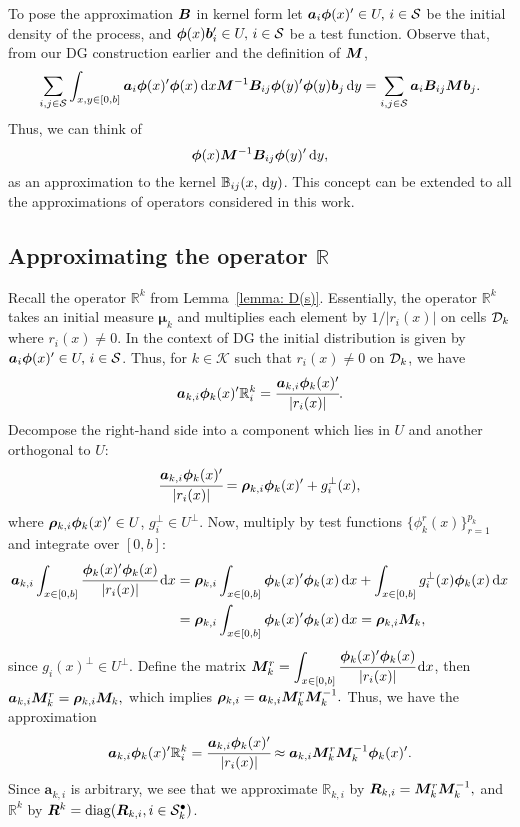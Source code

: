 To pose the approximation \(\boldsymbol B\) in kernel form let \(\boldsymbol a_i \boldsymbol \phi(x)'{}\in U,\,i\in\mathcal{S}\) be the initial density of the process, and \(\boldsymbol \phi(x)\boldsymbol b_i'{}\in U,\,i\in\mathcal{S}\) be a test function. Observe that, from our DG construction earlier and the definition of \({\boldsymbol M}\), 
\[\sum_{i,j\in\mathcal{S}}\int_{x,y\in[0,b]} \boldsymbol a_i \boldsymbol \phi(x)'{} \boldsymbol \phi (x) \, \mathrm{d} x {\boldsymbol M}^{-1}{  \boldsymbol B}_{ij} \boldsymbol \phi(y)'{} \boldsymbol \phi(y)\boldsymbol b_j \, \mathrm{d} y= \sum_{i,j\in\mathcal{S}} \boldsymbol a_i {  \boldsymbol B}_{ij} {\boldsymbol M} \boldsymbol b_j .\]
Thus, we can think of 
\[\boldsymbol \phi (x) {\boldsymbol M}^{-1}{  \boldsymbol B}_{ij} \boldsymbol \phi(y)'{}\, \mathrm{d} y,\]
as an approximation to the kernel \(\mathbb B_{ij}(x,\, \mathrm{d} y)\). This concept can be extended to all the approximations of operators considered in this work. 

\subsection{Approximating the operator \(\mathbb R\)}\label{sec: approx r}
Recall the operator \(\mathbb R^k\) from Lemma~\ref{lemma: D(s)}. Essentially, the operator \(\mathbb R^k\) takes an initial measure \(\boldsymbol \mu_k\) and multiplies each element by \(1/|r_i(x)|\) on cells \(\mathcal{D}_k\) where \(r_i(x)\neq 0\). In the context of DG the initial distribution is given by \(\boldsymbol a_i \boldsymbol \phi(x)'{}\in U,\,i\in\mathcal{S}\). Thus, for \(k\in\mathcal K\) such that \(r_i(x)\neq0\) on \(\mathcal{D}_k\), we have 
\[\boldsymbol a_{k,i} \boldsymbol \phi_k(x)'{}\mathbb R^k_i = \cfrac{\boldsymbol a_{k,i} \boldsymbol \phi_k(x)'{}}{|r_i(x)|}.\]
Decompose the right-hand side into a component which lies in \(U\) and another orthogonal to \(U\): 
\[\cfrac{\boldsymbol a_{k,i} \boldsymbol \phi_k(x)'{}}{|r_i(x)|} = \boldsymbol \rho_{k,i} \boldsymbol \phi_k(x)'{} + g_i^\perp(x),\] where \(\boldsymbol \rho_{k,i} \boldsymbol\phi_k(x)'{}\in U\), \(g_i^\perp \in U^\perp\). Now, multiply by test functions \(\{\phi^r_k(x)\}_{r=1}^{p_k}\) and integrate over \([0,b]\):
\begin{align*}
	\boldsymbol a_{k,i}\int_{x\in[0,b]} \cfrac{ \boldsymbol \phi_k(x)'{}\boldsymbol \phi_k(x)}{|r_i(x)|}\, \mathrm{d} x
	&=\boldsymbol \rho_{k,i} \int_{x\in[0,b]}\boldsymbol \phi_k(x)'{}\boldsymbol \phi_k(x)\, \mathrm{d} x + \int_{x\in[0,b]} g_i^\perp(x)\boldsymbol\phi_k(x)\, \mathrm{d} x 
	\\&= \boldsymbol \rho_{k,i} \int_{x\in[0,b]}\boldsymbol \phi_k(x)'{}\boldsymbol \phi_k(x)\, \mathrm{d} x = \boldsymbol \rho_{k,i}\boldsymbol M_k,
\end{align*}
since \(g_i(x)^\perp\in U^\perp\). Define the matrix \(\boldsymbol M_k^r = \displaystyle\int_{x\in[0,b]} \cfrac{ \boldsymbol \phi_k(x)'{}\boldsymbol \phi_k(x)}{|r_i(x)|}\, \mathrm{d} x\), then 
\(
	\boldsymbol a_{k,i}\boldsymbol M_k^r
	= \boldsymbol \rho_{k,i} \boldsymbol M_k,
\)
which implies
\(
	\boldsymbol \rho_{k,i}  = \boldsymbol a_{k,i}\boldsymbol M_k^r\boldsymbol M_k^{-1}.
\)
Thus, we have the approximation 
\[\boldsymbol a_{k,i} \boldsymbol \phi_k(x)'{}\mathbb R^k_i = \cfrac{\boldsymbol a_{k,i} \boldsymbol \phi_k(x)'{}}{|r_i(x)|}\approx \boldsymbol a_{k,i}\boldsymbol M_k^r\boldsymbol M_k^{-1}\boldsymbol\phi_k(x)'{}.\]
Since \(\boldsymbol a_{k,i}\) is arbitrary, we see that we approximate \(\mathbb R_{k,i}\) by \(  \boldsymbol R_{k,i} = \boldsymbol M_k^r\boldsymbol M_k^{-1},\)
and \(\mathbb R^k\) by \(  \boldsymbol R^k = \mathrm{diag}(  \boldsymbol R_{k,i},{i\in\mathcal{S}^\bullet_k})\).

